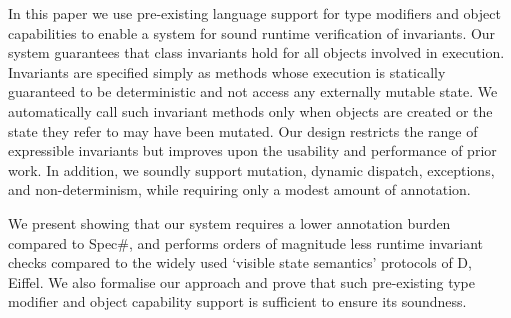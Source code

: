 In this paper we use pre-existing language support for type modifiers and object capabilities to enable a system for sound runtime verification of invariants.
Our system guarantees that class invariants hold for all objects involved in execution.
Invariants are specified simply as methods whose execution is statically guaranteed to be deterministic and not access any externally mutable state.
We automatically call such invariant methods only when objects are created or the state they refer to may have been mutated.
Our design restricts the range of expressible invariants but improves upon the usability and performance of prior work.
In addition, we soundly support mutation, dynamic dispatch, exceptions, and non-determinism, while requiring only a modest amount of annotation.

We present   showing that our system requires a lower annotation burden compared to Spec\#, and  performs orders of magnitude less runtime invariant checks compared to the widely used `visible state semantics' protocols of D, Eiffel.
We also formalise our approach and prove that such pre-existing type modifier and object capability support is sufficient to ensure its soundness. %
